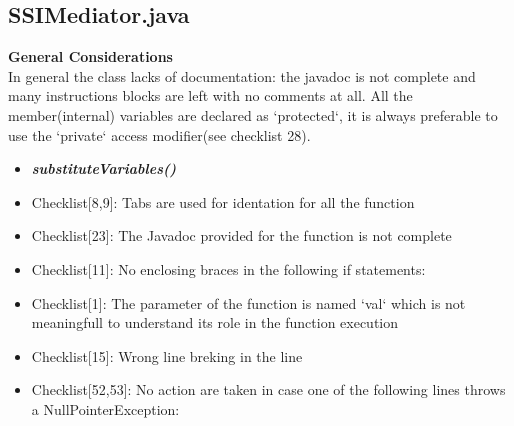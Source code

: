 \documentclass[11pt,titlepage]{article} %
\begin{document}
\begin{itemize}
  \end{itemize}


\subsection{SSIMediator.java}
  \textbf{General Considerations} \hfill \\
  In general the class lacks of documentation: the javadoc is not complete and many instructions blocks are left with no comments at all.\newline
  All the member(internal) variables are declared as `protected`, it is always preferable to use the `private` access modifier(see checklist 28). 
  \begin{itemize}
   \item \textbf{\textit{substituteVariables()}}
   \item Checklist[8,9]: Tabs are used for identation for all the function
   \item Checklist[23]: The Javadoc provided for the function is not complete 
   \item Checklist[11]: No enclosing braces in the following if statements:
    
    
    
    
    
   \item Checklist[1]: The parameter of the function is named `val` which is not meaningfull to understand its role in the function execution
   
   \item Checklist[15]: Wrong line breking in the line
    

   \item Checklist[52,53]: No action are taken in case one of the following lines throws a NullPointerException:
    
    
    
    

\end{itemize}
\end{document}
